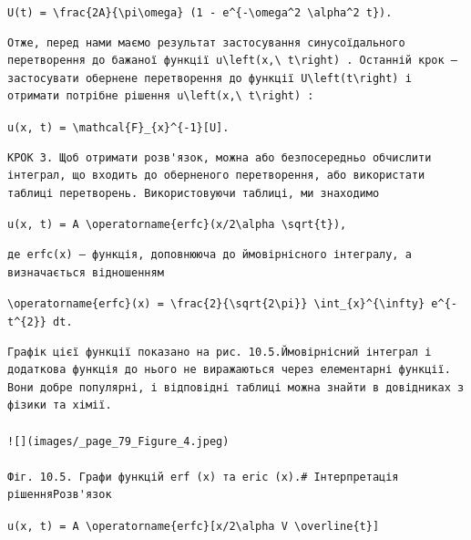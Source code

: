 \documentclass[
  ukrainian,
]{article}
\begin{document}
\texttt{U(t)\ =\ \textbackslash{}frac\{2A\}\{\textbackslash{}pi\textbackslash{}omega\}\ (1\ -\ e\^{}\{-\textbackslash{}omega\^{}2\ \textbackslash{}alpha\^{}2\ t\}).}

\begin{verbatim}
Отже, перед нами маємо результат застосування синусоїдального перетворення до бажаної функції u\left(x,\ t\right) . Останній крок — застосувати обернене перетворення до функції U\left(t\right) і отримати потрібне рішення u\left(x,\ t\right) :
\end{verbatim}

\texttt{u(x,\ t)\ =\ \textbackslash{}mathcal\{F\}\_\{x\}\^{}\{-1\}{[}U{]}.}

\begin{verbatim}
КРОК 3. Щоб отримати розв'язок, можна або безпосередньо обчислити інтеграл, що входить до оберненого перетворення, або використати таблиці перетворень. Використовуючи таблиці, ми знаходимо
\end{verbatim}

\texttt{u(x,\ t)\ =\ A\ \textbackslash{}operatorname\{erfc\}(x/2\textbackslash{}alpha\ \textbackslash{}sqrt\{t\}),}

\begin{verbatim}
де erfc(x) — функція, доповнююча до ймовірнісного інтегралу, а визначається відношенням
\end{verbatim}

\texttt{\textbackslash{}operatorname\{erfc\}(x)\ =\ \textbackslash{}frac\{2\}\{\textbackslash{}sqrt\{2\textbackslash{}pi\}\}\ \textbackslash{}int\_\{x\}\^{}\{\textbackslash{}infty\}\ e\^{}\{-t\^{}\{2\}\}\ dt.}

\begin{verbatim}
Графік цієї функції показано на рис. 10.5.Ймовірнісний інтеграл і додаткова функція до нього не виражаються через елементарні функції. Вони добре популярні, і відповідні таблиці можна знайти в довідниках з фізики та хімії.

![](images/_page_79_Figure_4.jpeg)

Фіг. 10.5. Графи функцій erf (x) та eric (x).# Інтерпретація рішенняРозв'язок
\end{verbatim}

\texttt{u(x,\ t)\ =\ A\ \textbackslash{}operatorname\{erfc\}{[}x/2\textbackslash{}alpha\ V\ \textbackslash{}overline\{t\}{]}}
\end{document}

